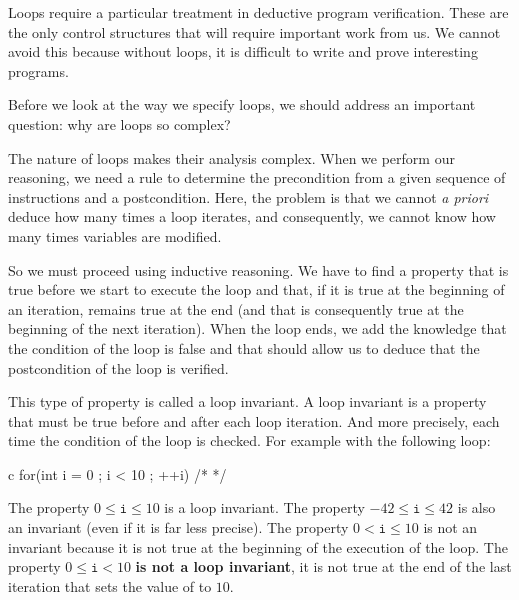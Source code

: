 Loops require a particular treatment in deductive program verification.
These are the only control structures that will require
important work from us. We cannot avoid this because without loops, it
is difficult to write and prove interesting programs.



Before we look at the way we specify loops, we should address an important
question: why are loops so complex?



\label{l3:statements-loops-invariant}


The nature of loops makes their analysis complex. When we perform our
reasoning, we need a rule to determine the precondition from a given sequence
of instructions and a postcondition. Here, the problem is that we cannot
\emph{a priori} deduce how many times a loop iterates, and consequently, we
cannot know how many times variables are modified.



So we must proceed using inductive reasoning. We have to find a
property that is true before we start to execute the loop and that, if
it is true at the beginning of an iteration, remains true at the end
(and that is consequently true at the beginning of the next iteration).
When the loop ends, we add the knowledge that the condition of the loop is
false and that should allow us to deduce that the postcondition of the loop
is verified.



This type of property is called a loop invariant. A loop invariant is a
property that must be true before and after each loop iteration. And more
precisely, each time the condition of the loop is checked. For example with
the following loop:



\begin{CodeBlock}{c}
for(int i = 0 ; i < 10 ; ++i){ /* */ }
\end{CodeBlock}



The property $0 \leq \texttt{i} \leq 10$ is a loop invariant. The property
$-42 \leq \texttt{i} \leq 42$ is also an invariant (even if it is far less
precise). The property $0 < \texttt{i} \leq 10$ is not an invariant because it is
not true at the beginning of the execution of the loop. The property
$0 \leq \texttt{i} < 10$ \textbf{is not a loop invariant}, it is not true at the
end of the last iteration that sets the value of  to $10$.

